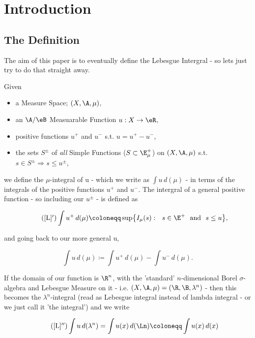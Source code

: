 \section{Introduction} \label{intro}
\subsection{The Definition} \label{def}

The aim of this paper is to eventually define the Lebesgue Intergral - so lets just try to do that straight away.
\begin{definition}
	Given
	\begin{itemize}
		\item a Measure Space; $(X, \A, \mu)$,
		\item an $\A/\eB$ Measuarable Function $u : X \rightarrow \eR$,
		\item positive functions $u^+$ and $u^-$ s.t. $u = u^+ - u^-$,
		\item the sets $S^{\pm}$ of {\em all} Simple Functions ($S \subset \E_\mu^+$) on $(X, \A, \mu)$ s.t. $s \in S^{\pm} \Rightarrow s \leq u^{\pm}$,
	\end{itemize}

	we define the $\mu$-integral of u - which we write as $\int u\,d(\mu)$ - in terms of the integrals of the positive functions $u^+$ and 			$u^-$. The intergral of a general positive function - so including our $u^{\pm}$ - is defined as

	\begin{equation*}\label{posint}\tag{\ref{L}$'$}
	\int u^+\,d(\mu) \coloneqq \sup\bigr\{ I_\mu(s) : \ \  s \in \E^+ \hbox{ \ and \ } s \le u \bigl\},
	\end{equation*}

	and going back to our more general u, 

	\begin{equation}\label{L}
	\int u\,d(\mu) \coloneqq \int u^+\,d(\mu) - \int u^-\,d(\mu).
	\end{equation}

	If the domain of our function is $\R^n$, with the 'standard' $n$-dimensional Borel $\sigma$-algebra and Lebesgue Measure on it - i.e. $(X, \A, \mu) 	= (\R, \B, \lambda^n)$ - then this becomes the $\lambda^n$-integral (read as Lebesgue integral instead of lambda integral - or we just 			call it 'the integral') and we write

	\begin{equation*} \tag{\ref{L}$''$}
	\int u\,d(\lambda^n) =  \int u(x)\,d(\Ln) \coloneqq \int u(x)\,d(x) 
	\end{equation*}
\end{definition}

